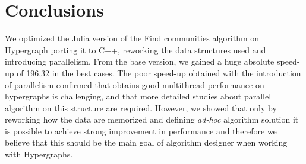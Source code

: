 \documentclass[conference]{IEEEtran}
\begin{document}
\section{Conclusions}

We optimized the Julia version of the Find communities algorithm on Hypergraph porting it to C++, reworking the data structures used and introducing parallelism.
From the base version, we gained a huge absolute speed-up of 196,32 in the best cases.
The poor speed-up obtained with the introduction of parallelism confirmed that obtains good multithread performance on hypergraphs is challenging, and that more detailed studies about parallel algorithm on this structure are required.
However, we showed that only by reworking how the data are memorized and defining \textit{ad-hoc} algorithm solution it is possible to achieve strong improvement in performance and therefore we believe that this should be the main goal of algorithm designer when working with Hypergraphs.
\end{document}

